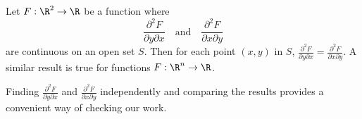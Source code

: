 \documentclass{ximera}
\begin{document}
\begin{theorem}
  Let $F:\R^2\to \R$ be a function where
  \[
  \frac{\partial^2F}{\partial y\partial x}\quad\text{and}\quad\frac{\partial^2F}{\partial x\partial y}
  \]
  are continuous on an open set $S$. Then for each point $(x,y)$ in
  $S$, $\frac{\partial^2F}{\partial y\partial
    x}=\frac{\partial^2F}{\partial x\partial y}$.
  A similar result is true for functions $F:\R^n\to \R$.
\end{theorem}

Finding $\frac{\partial^2F}{\partial y\partial x}$ and
$\frac{\partial^2F}{\partial x\partial y}$ independently and comparing
the results provides a convenient way of checking our work.
\end{document}

